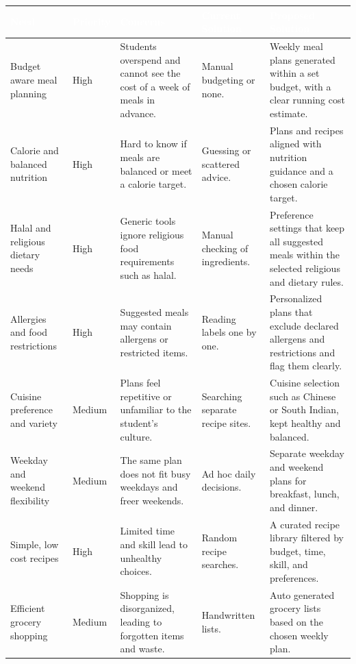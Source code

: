 \documentclass[11pt,a4paper]{article}
\begin{document}
\begin{longtable}{>{\raggedright\arraybackslash}p{} >{\raggedright\arraybackslash}p{} >{\raggedright\arraybackslash}p{} >{\raggedright\arraybackslash}p{} >{\raggedright\arraybackslash}p{}}
\toprule
\rowcolor{tablehead}\textcolor{white}{\textbf{Need}} & \textcolor{white}{\textbf{Priority}} & \textcolor{white}{\textbf{Concerns}} & \textcolor{white}{\textbf{Current Solution}} & \textcolor{white}{\textbf{Proposed Solution}} \\
\midrule
\endhead
Budget aware meal planning & High & Students overspend and cannot see the cost of a week of meals in advance. & Manual budgeting or none. & Weekly meal plans generated within a set budget, with a clear running cost estimate. \\
\rowcolor{tablealt}
Calorie and balanced nutrition & High & Hard to know if meals are balanced or meet a calorie target. & Guessing or scattered advice. & Plans and recipes aligned with nutrition guidance and a chosen calorie target. \\
Halal and religious dietary needs & High & Generic tools ignore religious food requirements such as halal. & Manual checking of ingredients. & Preference settings that keep all suggested meals within the selected religious and dietary rules. \\
\rowcolor{tablealt}
Allergies and food restrictions & High & Suggested meals may contain allergens or restricted items. & Reading labels one by one. & Personalized plans that exclude declared allergens and restrictions and flag them clearly. \\
Cuisine preference and variety & Medium & Plans feel repetitive or unfamiliar to the student's culture. & Searching separate recipe sites. & Cuisine selection such as Chinese or South Indian, kept healthy and balanced. \\
\rowcolor{tablealt}
Weekday and weekend flexibility & Medium & The same plan does not fit busy weekdays and freer weekends. & Ad hoc daily decisions. & Separate weekday and weekend plans for breakfast, lunch, and dinner. \\
Simple, low cost recipes & High & Limited time and skill lead to unhealthy choices. & Random recipe searches. & A curated recipe library filtered by budget, time, skill, and preferences. \\
\rowcolor{tablealt}
Efficient grocery shopping & Medium & Shopping is disorganized, leading to forgotten items and waste. & Handwritten lists. & Auto generated grocery lists based on the chosen weekly plan. \\
\bottomrule
\end{longtable}
\end{document}
